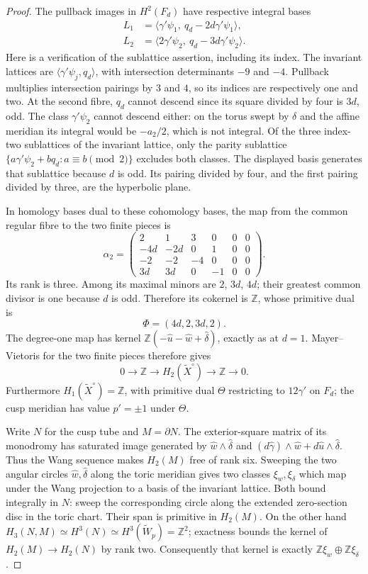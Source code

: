 \begin{proof}
The pullback images in $H^2(F_d)$ have respective integral bases
\[
 \begin{aligned}
 L_1&=\langle\gamma'\psi_1,\ q_d-2d\gamma'\psi_1\rangle,\\
 L_2&=\langle2\gamma'\psi_2,\ q_d-3d\gamma'\psi_2\rangle.
 \end{aligned}
\]
Here is a verification of the sublattice assertion, including its
index. The invariant lattices are
$\langle\gamma'\psi_j,q_d\rangle$, with intersection determinants
$-9$ and $-4$. Pullback multiplies intersection pairings by $3$ and
$4$, so its indices are respectively one and two. At the second
fibre, $q_d$ cannot descend since its square divided by four is
$3d$, odd. The class $\gamma'\psi_2$ cannot descend either: on the
torus swept by $\delta$ and the affine meridian its integral would
be $-a_2/2$, which is not integral. Of the three index-two sublattices
of the invariant lattice, only the parity sublattice
$\{a\gamma'\psi_2+bq_d:a\equiv b\pmod2\}$ excludes both classes.
The displayed basis generates that sublattice because $d$ is odd.
Its pairing divided by four, and the first pairing divided by three,
are the hyperbolic plane.

In homology bases dual to these cohomology bases, the map from the
common regular fibre to the two finite pieces is
\[
 \alpha_2=
 \begin{pmatrix}
 2&1&3&0&0&0\\
 -4d&-2d&0&1&0&0\\
 -2&-2&-4&0&0&0\\
 3d&3d&0&-1&0&0
 \end{pmatrix}.
\]
Its rank is three. Among its maximal minors are $2$, $3d$, $4d$;
their greatest common divisor is one because $d$ is odd. Therefore
its cokernel is $\mathbb Z$, whose primitive dual is
\[
 \Phi=(4d,2,3d,2).
\]
The degree-one map has kernel
$\mathbb Z(-\widehat u-\widehat w+\widehat\delta)$, exactly as at
$d=1$. Mayer--Vietoris for the two finite pieces therefore gives
\[
 0\longrightarrow\mathbb Z\longrightarrow H_2(\widetilde X^\circ)
 \longrightarrow\mathbb Z\longrightarrow0.
\]
Furthermore $H_1(\widetilde X^\circ)=\mathbb Z$, with primitive dual
$\Theta$ restricting to $12\gamma'$ on $F_d$; the cusp meridian
has value $p'=\pm1$ under $\Theta$.

Write $N$ for the cusp tube and $M=\partial N$. The exterior-square
matrix of its monodromy has saturated image generated by
$\widehat w\wedge\widehat\delta$ and
$(d\widehat\gamma)\wedge\widehat w+d\widehat u\wedge\widehat\delta$.
Thus the Wang sequence makes $H_2(M)$ free of rank six. Sweeping the
two angular circles $\widehat w,\widehat\delta$ along the toric
meridian gives two classes $\xi_w,\xi_\delta$ which map under the
Wang projection to a basis of the invariant lattice. Both bound
integrally in $N$: sweep the corresponding circle along the extended
zero-section disc in the toric chart. Their span is primitive in
$H_2(M)$. On the other hand
$H_3(N,M)\simeq H^3(N)\simeq H^3(\widetilde W_p)=\mathbb Z^2$;
exactness bounds the kernel of $H_2(M)\to H_2(N)$ by rank two.
Consequently that kernel is exactly
$\mathbb Z\xi_w\oplus\mathbb Z\xi_\delta$.


\end{proof}
